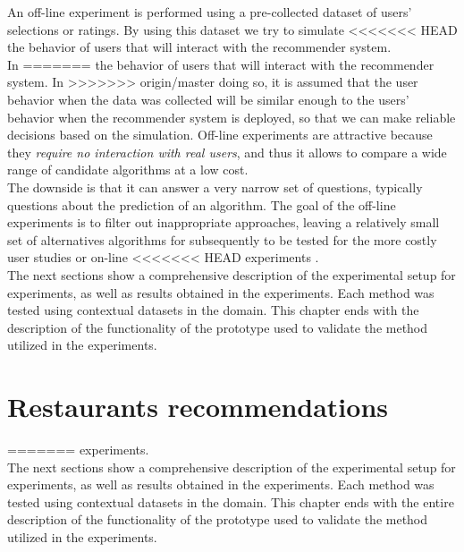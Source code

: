 An off-line experiment is performed using a pre-collected dataset
of users' selections or ratings. By using this dataset we try to simulate
<<<<<<< HEAD
the behavior of users that will interact with the recommender system. \\In
=======
the behavior of users that will interact with the recommender system. In
>>>>>>> origin/master
doing so, it is assumed that the user behavior when the data was collected
will be similar enough to the users' behavior when the recommender
system is deployed, so that we can make reliable decisions based on
the simulation.  Off-line experiments are attractive because they
\textit{require no interaction with real users}, and thus it allows to compare
a wide range of candidate algorithms at a low cost. \\ The downside is
that it can answer a very narrow set of questions, typically questions
about the prediction of an algorithm. The goal of the off-line
experiments is to filter out inappropriate  approaches, leaving a
relatively small set of alternatives algorithms for subsequently to be
tested for the more costly user studies or on-line 
<<<<<<< HEAD
experiments  \cite{adomavicius2011context}.\\
The next sections show a comprehensive description of the 
experimental setup for experiments, as well as results obtained 
in the experiments. Each method was tested using contextual 
datasets in the domain.  This chapter ends with the  
description of the functionality of the prototype used to 
validate the method utilized in the experiments.

\section{Restaurants recommendations} \label{restaurants}

=======
experiments\cite{adomavicius2011context}.\\ 

The next sections show a comprehensive description of the 
experimental setup for experiments, as well as results obtained 
in the experiments. Each method was tested using contextual 
datasets in the domain.  This chapter ends with the entire 
description of the functionality of the prototype used to 
validate the method utilized in the experiments.


